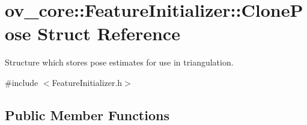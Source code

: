\hypertarget{structov__core_1_1FeatureInitializer_1_1ClonePose}{}\section{ov\+\_\+core\+:\+:Feature\+Initializer\+:\+:Clone\+Pose Struct Reference}
\label{structov__core_1_1FeatureInitializer_1_1ClonePose}


Structure which stores pose estimates for use in triangulation.  




{\ttfamily \#include $<$Feature\+Initializer.\+h$>$}

\subsection*{Public Member Functions}
